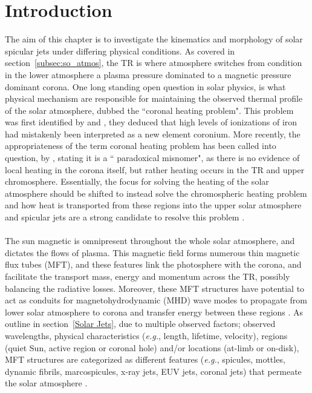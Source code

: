\documentclass[12pt]{ociamthesis}
\newcommand{\np}{\\ \\}
\begin{document}
\section{Introduction}
\label{sec:c2intro}
The aim of this chapter is to investigate the kinematics and morphology of solar spicular jets under differing physical conditions. As covered in section~\ref{subsec:so_atmos}, the TR is where atmosphere switches from condition in the lower atmosphere a plasma pressure dominated to a magnetic pressure dominant corona. One long standing open question in solar physics, is what physical mechanism are responsible for maintaining the observed thermal profile of the solar atmosphere, dubbed the ``coronal heating problem". This problem was first identified by \cite{Grotrian1939} and \cite{Edl1943}, they deduced that high levels of ionizations of iron had mistakenly been interpreted as a new element coronium. More recently, the appropriateness of the term coronal heating problem has been called into question, by \cite{Aschwanden2007ApJ}, stating it is a `` paradoxical misnomer", as there is no evidence of local heating in the corona itself, but rather heating occurs in the TR and upper chromosphere. Essentially, the focus for solving the heating of the solar atmosphere should be shifted to instead solve the chromospheric heating problem and how heat is transported from these regions into the upper solar atmosphere and spicular jets are a strong candidate to resolve this problem \citep{Kudoh1999ApJ514493K, Pontieu2007PASJ, Martinez-Sykora2017,Moore2011ApJ731L18M, Pontieu2017ApJ, Samanta2019Sci, Zuo2019AcASn, Bale2019Natur}.\np
%
The sun magnetic is omnipresent throughout the whole solar atmosphere, and dictates the flows of plasma. This magnetic field forms numerous thin magnetic flux tubes (MFT), and these features link the photosphere with the corona, and facilitate the transport mass, energy and momentum across the TR, possibly balancing the radiative losses. Moreover, these MFT structures have potential to act as conduits for magnetohydrodynamic (MHD) wave modes to propagate from lower solar atmosphere to corona and transfer energy between these regions \citep{Pontieu2004Natur, Kukhianidze2006AA449L35K, Zaqarashvili2007AA474627Z, He2009AA497525H}. As outline in section~\ref{Solar Jets}, due to multiple observed factors; observed wavelengths, physical characteristics (\textit{e.g.}, length, lifetime, velocity), regions (quiet Sun, active region or coronal hole) and/or locations (at-limb or on-disk), MFT structures are categorized as different features (\textit{e.g.}, spicules, mottles, dynamic fibrils, marcospicules, x-ray jets, EUV jets, coronal jets) that permeate the solar atmosphere \citep[see reviews by:][]{Beckers1968, Beckers1972ARA&A, Tsiropoula2012}. \np
\end{document}
